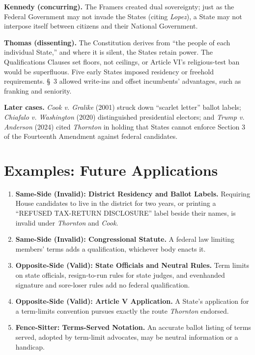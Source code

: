 \documentclass[12pt]{article}
\begin{document}
\textbf{Kennedy (concurring).} The Framers created dual sovereignty; just as the Federal Government may not invade the States (citing \textit{Lopez}), a State may not interpose itself between citizens and their National Government.

\textbf{Thomas (dissenting).} The Constitution derives from ``the people of each individual State,'' and where it is silent, the States retain power. The Qualifications Clauses set floors, not ceilings, or Article VI's religious-test ban would be superfluous. Five early States imposed residency or freehold requirements. \S~3 allowed write-ins and offset incumbents' advantages, such as franking and seniority.

\textbf{Later cases.} \textit{Cook v. Gralike} (2001) struck down ``scarlet letter'' ballot labels; \textit{Chiafalo v. Washington} (2020) distinguished presidential electors; and \textit{Trump v. Anderson} (2024) cited \textit{Thornton} in holding that States cannot enforce Section 3 of the Fourteenth Amendment against federal candidates.

\section{Examples: Future Applications}

\begin{enumerate}
\item \textbf{Same-Side (Invalid): District Residency and Ballot Labels.} Requiring House candidates to live in the district for two years, or printing a ``REFUSED TAX-RETURN DISCLOSURE'' label beside their names, is invalid under \textit{Thornton} and \textit{Cook}.
\item \textbf{Same-Side (Invalid): Congressional Statute.} A federal law limiting members' terms adds a qualification, whichever body enacts it.
\item \textbf{Opposite-Side (Valid): State Officials and Neutral Rules.} Term limits on state officials, resign-to-run rules for state judges, and evenhanded signature and sore-loser rules add no federal qualification.
\item \textbf{Opposite-Side (Valid): Article V Application.} A State's application for a term-limits convention pursues exactly the route \textit{Thornton} endorsed.
\item \textbf{Fence-Sitter: Terms-Served Notation.} An accurate ballot listing of terms served, adopted by term-limit advocates, may be neutral information or a handicap.
\end{enumerate}
\end{document}

